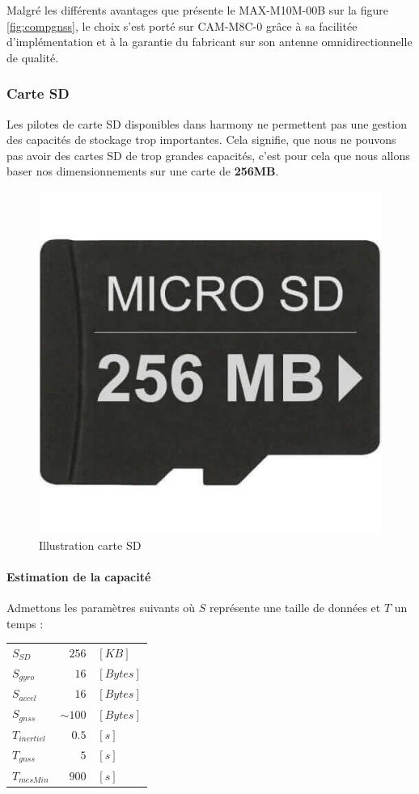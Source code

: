 Malgré les différents avantages que présente le MAX-M10M-00B sur la figure \ref{fig:compgnss}, le choix s'est porté sur CAM-M8C-0 grâce à sa facilitée d'implémentation et à la garantie du fabricant sur son antenne omnidirectionnelle de qualité.

\clearpage

\subsubsection{Carte SD} 
Les pilotes de carte SD disponibles dans \gls{harmony} ne permettent pas une gestion des capacités de stockage trop importantes. Cela signifie, que nous ne pouvons pas avoir des cartes SD de trop grandes capacités, c'est pour cela que nous allons baser nos dimensionnements sur une carte de \textbf{256MB}. 

\begin{figure}[h]
	\centering
	\includegraphics[width=0.2\linewidth]{../figures/pre_etude/CarteSD_Illustration}
	\caption{Illustration carte SD}
	\label{fig:cartesdillustration}
\end{figure}


\paragraph{Estimation de la capacité} Admettons les paramètres suivants où $S$ représente une taille de données et $T$ un temps :

\begin{tabular}{lrl}
	$S_{SD}$ & $256$ & $[KB]$ \\
	$S_{gyro}$ & $16$ & $[Bytes]$ \\
	$S_{accel}$ & $16$ & $[Bytes]$ \\
	$S_{gnss}$ & $\sim100$ & $[Bytes]$ \\
	$T_{inertiel}$ & $0.5$ & $[s]$ \\
	$T_{gnss}$ & $5$ & $[s]$ \\
	$T_{mesMin}$ & $900$ & $[s]$ \\
\end{tabular}

